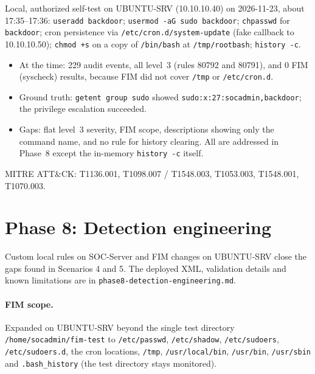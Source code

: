 \documentclass[11pt,a4paper]{article}
\begin{document}
Local, authorized self-test on UBUNTU-SRV (10.10.10.40) on 2026-11-23, about
17:35--17:36: \texttt{useradd backdoor}; \texttt{usermod -aG sudo backdoor};
\texttt{chpasswd} for \texttt{backdoor}; cron persistence via
\texttt{/etc/cron.d/system-update} (fake callback to 10.10.10.50);
\texttt{chmod +s} on a copy of \texttt{/bin/bash} at \texttt{/tmp/rootbash};
\texttt{history -c}.

\begin{itemize}
  \item At the time: 229 audit events, all level~3 (rules 80792 and 80791),
        and 0 FIM (syscheck) results, because FIM did not cover \texttt{/tmp}
        or \texttt{/etc/cron.d}.
  \item Ground truth: \texttt{getent group sudo} showed
        \texttt{sudo:x:27:socadmin,backdoor}; the privilege escalation
        succeeded.
  \item Gaps: flat level~3 severity, FIM scope, descriptions showing only the
        command name, and no rule for history clearing. All are addressed in
        Phase~8 except the in-memory \texttt{history -c} itself.
\end{itemize}

MITRE ATT\&CK: T1136.001, T1098.007 / T1548.003, T1053.003, T1548.001,
T1070.003.

\section{Phase 8: Detection engineering}

Custom local rules on SOC-Server and FIM changes on UBUNTU-SRV close the gaps
found in Scenarios 4 and 5. The deployed XML, validation details and known
limitations are in \texttt{phase8-detection-engineering.md}.

\paragraph{FIM scope.} Expanded on UBUNTU-SRV beyond the single test directory
\texttt{/home/\allowbreak socadmin/\allowbreak fim-test} to \texttt{/etc/passwd},
\texttt{/etc/shadow}, \texttt{/etc/sudoers}, \texttt{/etc/sudoers.d}, the
cron locations, \texttt{/tmp}, \texttt{/usr/local/bin}, \texttt{/usr/bin},
\texttt{/usr/sbin} and \texttt{.bash\_history} (the test directory stays monitored).
\end{document}
